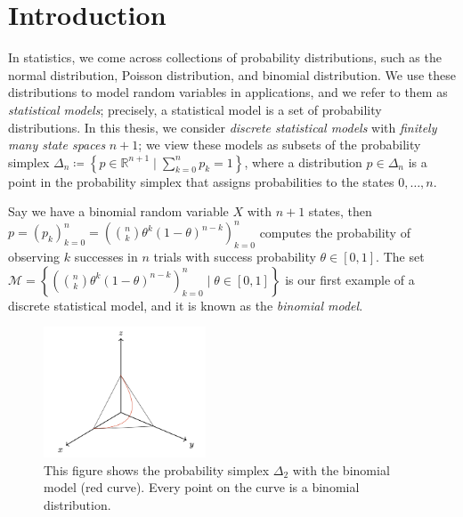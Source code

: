 \chapter{Introduction} 

In statistics, we come across collections of probability distributions, such as the normal distribution, Poisson distribution, and binomial distribution. We use these distributions to model random variables in applications, and we refer to them as \emph{statistical models}; precisely, a statistical model is a set of probability distributions. In this thesis, we consider \emph{discrete statistical models} with \emph{finitely many state spaces} \( n + 1 \); we view these models as subsets of the probability simplex \( \Delta_n \coloneqq \left\{ p \in \mathbb{R}^{n + 1} \mid \sum_{k=0}^n p_k = 1 \right\} \), where a distribution \( p \in \Delta_n \) is a point in the probability simplex that assigns probabilities to the states \( 0, \dots, n \).
 
\begin{example}
Say we have a binomial random variable \( X \) with \( n + 1 \) states, then \( p = (p_k)_{k=0}^n = (\binom{n}{k} \theta^k (1-\theta)^{n-k})_{k=0}^n \) computes the probability of observing \( k \) successes in \( n \) trials with success probability \( \theta \in [0,1] \). The set \( \mathcal{M} = \left\{ (\binom{n}{k} \theta^k (1-\theta)^{n-k})_{k=0}^n \mid \theta \in [0,1] \right\} \) is our first example of a discrete statistical model, and it is known as the \emph{binomial model}.

\begin{figure}[H]
    \centering
    \includegraphics[width=0.43\textwidth]{assets/binom-discrete-model.png}
    \caption{This figure shows the probability simplex \( \Delta_2 \) with the binomial model (red curve). Every point on the curve is a binomial distribution.}
    \label{fig:binom-discrete-model}
\end{figure}
\end{example}

